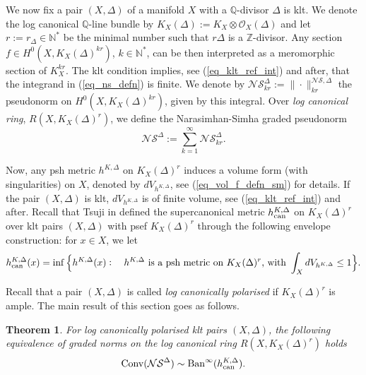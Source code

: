 \documentclass[12pt]{article}
\numberwithin{equation}{section}
\theoremstyle{theorem}
\newtheorem{thm}{Theorem}[section]
\theoremstyle{definition}
\theoremstyle{remark}
\newcommand{\nat}{\mathbb{N}}
\newcommand{\Conv}[1]{{\rm{Conv}}{(#1)}}
\begin{document}
	\begin{sloppypar} 
	\par 
	We now fix a pair $(X, \Delta)$ of a manifold $X$ with a $\mathbb{Q}$-divisor $\Delta$ is klt.
	We denote the log canonical $\mathbb{Q}$-line bundle by $K_X(\Delta) := K_X \otimes \mathscr{O}_X(\Delta)$ and let $r := r_{\Delta} \in \nat^*$ be the minimal number such that $r \Delta$ is a $\mathbb{Z}$-divisor.
	Any section $f \in H^0(X, K_X(\Delta)^{kr})$, $k \in \nat^*$, can be then interpreted as a meromorphic section of $K_X^{kr}$.
	The klt condition implies, see (\ref{eq_klt_ref_int}) and after, that the integrand in (\ref{eq_ns_defn}) is finite.
	We denote by $\mathcal{NS}_{kr}^{\Delta} := \| \cdot \|^{\mathcal{NS}, \Delta}_{kr}$ the pseudonorm on $H^0(X, K_X(\Delta)^{kr})$, given by this integral.
	Over \textit{log canonical ring}, $R(X, K_X(\Delta)^r)$, we define the Narasimhan-Simha graded pseudonorm
	\begin{equation}
		\mathcal{NS}^{\Delta} := \sum_{k = 1}^{\infty} \mathcal{NS}_{kr}^{\Delta}.
	\end{equation}
	\par 
	Now, any psh metric $h^{K, \Delta}$ on $K_X(\Delta)^{r}$ induces a volume form (with singularities) on $X$, denoted by $dV_{h^{K, \Delta}}$, see (\ref{eq_vol_f_defn_sm}) for details. 
	If the pair $(X, \Delta)$ is klt, $dV_{h^{K, \Delta}}$ is of finite volume, see (\ref{eq_klt_ref_int}) and after.
	Recall that Tsuji in \cite{TsuCanKah} defined the supercanonical metric $h^{K, \Delta}_{{\rm{can}}}$ on $K_X(\Delta)^{r}$ over klt pairs $(X, \Delta)$ with psef $K_X(\Delta)^r$ through the following envelope construction: for $x \in X$, we let
	\begin{equation}\label{defn_tsu_m}
		h^{K, \Delta}_{{\rm{can}}}(x)
		=
		\inf \Big\{ 
			h^{K, \Delta}(x) : \quad h^{K, \Delta} \text{ is a psh metric on $K_X(\Delta)^{r}$, with } \int_X dV_{h^{K, \Delta}} \leq 1
		\Big\}.
	\end{equation}
	\par 
	Recall that a pair $(X, \Delta)$ is called \textit{log canonically polarised} if $K_X(\Delta)^{r}$ is ample.
	The main result of this section goes as follows.
	\begin{thm}\label{thm_ns_conv}
		For log canonically polarised klt pairs $(X, \Delta)$, the following equivalence of graded norms on the log canonical ring $R(X, K_X(\Delta)^{r})$ holds 
		\begin{equation}
			\Conv{\mathcal{NS}^{\Delta}} \sim {\rm{Ban}}^{\infty}(h^{K, \Delta}_{{\rm{can}}}).

\end{equation}
\end{thm}
\end{sloppypar}
\end{document}
